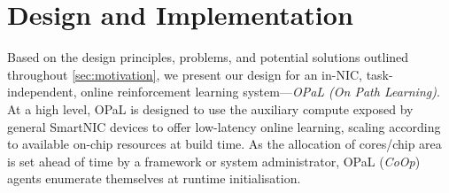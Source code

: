 \documentclass[sigconf,natbib=false]{acmart}
\newcommand{\approach}{On Path Learning}
\newcommand{\approachshort}{OPaL}
\newcommand{\Coopfw}{\emph{CoOp}}
\begin{document}
\section{Design and Implementation}\label{sec:design}
Based on the design principles, problems, and potential solutions outlined throughout \cref{sec:motivation}, we present our design for an in-NIC, task-independent, online reinforcement learning system---\emph{\approachshort{} (\approach)}.
At a high level, \approachshort{} is designed to use the auxiliary compute exposed by general SmartNIC devices to offer low-latency online learning, scaling according to available on-chip resources at build time.
As the allocation of cores/chip area is set ahead of time by a framework or system administrator, \approachshort{} (\Coopfw) agents enumerate themselves at runtime initialisation.
\end{document}
